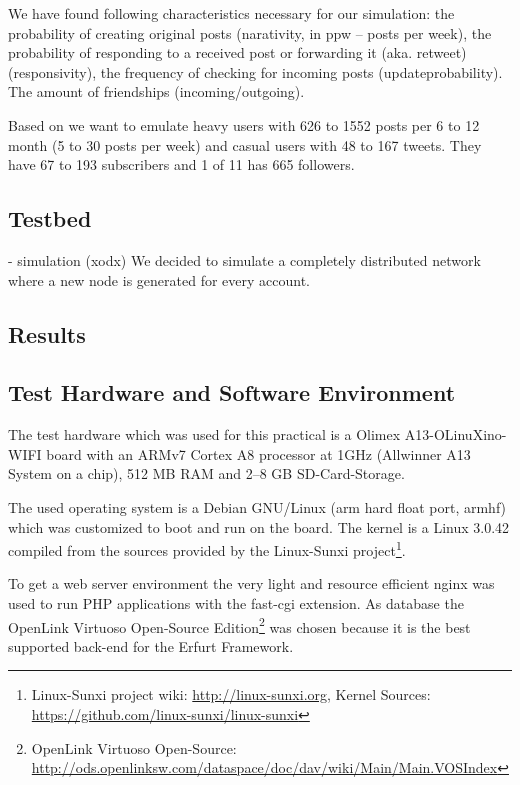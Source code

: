 \documentclass{llncs}
\begin{document}
We have found following characteristics necessary for our simulation:
the probability of creating original posts (narativity, in ppw – posts per week), the probability of responding to a received post or forwarding it (aka. retweet) (responsivity), the frequency of checking for incoming posts (updateprobability).
The amount of friendships (incoming/outgoing).

Based on \cite{zhao-d-2009--} we want to emulate heavy users with 626 to 1552 posts per 6 to 12 month (5 to 30 posts per week) and casual users with 48 to 167 tweets. They have 67 to 193 subscribers and 1 of 11 has 665 followers.

\subsection{Testbed}
- simulation (xodx)
We decided to simulate a completely distributed network where a new node is generated for every account.

\subsection{Results}


\subsection{Test Hardware and Software Environment}
The test hardware which was used for this practical is a Olimex A13-OLinuXino-WIFI board with an ARMv7 Cortex A8 processor at 1GHz (Allwinner A13 System on a chip), 512 MB RAM and 2–8 GB SD-Card-Storage.

The used operating system is a Debian GNU/Linux (arm hard float port, armhf) which was customized to boot and run on the board.
The kernel is a Linux 3.0.42 compiled from the sources provided by the Linux-Sunxi project\footnote{Linux-Sunxi project wiki: \url{http://linux-sunxi.org}, Kernel Sources: \url{https://github.com/linux-sunxi/linux-sunxi}}.

To get a web server environment the very light and resource efficient nginx was used to run PHP applications with the fast-cgi extension.
As database the Open\-Link Vir\-tu\-oso Open-Source Edition\footnote{Open\-Link Vir\-tu\-oso Open-Source: \url{http://ods.openlinksw.com/dataspace/doc/dav/wiki/Main/Main.VOSIndex}} was chosen because it is the best supported back-end for the Erfurt Framework.


\todos



\end{document}
